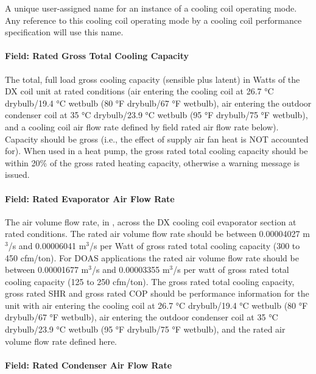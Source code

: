 A unique user-assigned name for an instance of a cooling coil operating mode. Any reference to this cooling coil operating mode by a cooling coil performance specification will use this name.

\paragraph{Field: Rated Gross Total Cooling Capacity}\label{field-rated-gross-total-cooling-capacity-1}

The total, full load gross cooling capacity (sensible plus latent) in Watts of the DX coil unit at rated conditions (air entering the cooling coil at 26.7 °C drybulb/19.4 °C wetbulb (80 °F drybulb/67 °F wetbulb), air entering the outdoor condenser coil at 35 °C drybulb/23.9 °C wetbulb (95 °F drybulb/75 °F wetbulb), and a cooling coil air flow rate defined by field rated air flow rate below). Capacity should be gross (i.e., the effect of supply air fan heat is NOT accounted for). When used in a heat pump, the gross rated total cooling capacity should be within 20\% of the gross rated heating capacity, otherwise a warning message is issued.

\paragraph{Field: Rated Evaporator Air Flow Rate}\label{field-rated-evaporator-air-flow-rate-2}

The air volume flow rate, in \si{\volumeFlowRate}, across the DX cooling coil evaporator section at rated conditions. The rated air volume flow rate should be between 0.00004027 m\(^{3}\)/s and 0.00006041 m\(^{3}\)/s per Watt of gross rated total cooling capacity (300 to 450 cfm/ton). For DOAS applications the rated air volume flow rate should be between 0.00001677 m\(^{3}\)/s and 0.00003355 m\(^{3}\)/s per watt of gross rated total cooling capacity (125 to 250 cfm/ton). The gross rated total cooling capacity, gross rated SHR and gross rated COP should be performance information for the unit with air entering the cooling coil at 26.7 °C drybulb/19.4 °C wetbulb (80 °F drybulb/67 °F wetbulb), air entering the outdoor condenser coil at 35 °C drybulb/23.9 °C wetbulb (95 °F drybulb/75 °F wetbulb), and the rated air volume flow rate defined here.

\paragraph{Field: Rated Condenser Air Flow Rate}\label{field-rated-condenser-air-flow-rate-2}

